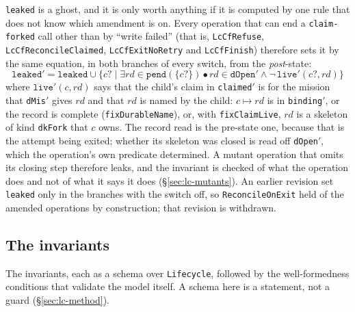 \documentclass[a4paper,10pt,fleqn]{article}
\newcommand{\field}[1]{\texttt{#1}}
\begin{document}
\field{leaked} is a ghost, and it is only worth anything if it is computed
by one rule that does not know which amendment is on. Every operation that
can end a \field{claim-forked} call other than by ``write failed'' (that
is, \field{LcCfRefuse}, \field{LcCfReconcileClaimed}, \field{LcCfExitNoRetry}
and \field{LcCfFinish}) therefore sets it by the same equation, in both
branches of every switch, from the \emph{post}-state:
\[
\field{leaked}' = \field{leaked} \cup \{ c? \mid \exists rd \in \field{pend}(\{c?\}) \bullet
  rd \in \field{dOpen}' \land \lnot\,\field{live}'(c?, rd) \}
\]
where $\field{live}'(c, rd)$ says that the child's claim in
\field{claimed}$'$ is for the mission that \field{dMis}$'$ gives $rd$ and
that $rd$ is named by the child: $c \mapsto rd$ is in \field{binding}$'$, or
the record is complete (\field{fixDurableName}), or, with
\field{fixClaimLive}, $rd$ is a skeleton of kind \field{dkFork} that $c$
owns. The record read is the pre-state one, because that is the
attempt being exited; whether its skeleton was closed is read off
\field{dOpen}$'$, which the operation's own predicate determined. A mutant
operation that omits its closing step therefore leaks, and the invariant is
checked of what the operation does and not of what it says it does
(\S\ref{sec:lc-mutants}). An earlier revision set \field{leaked} only in the
branches with the switch off, so \field{ReconcileOnExit} held of the
amended operations by construction; that revision is withdrawn.


\subsection{The invariants}
\label{sec:lc-invariants}

The invariants, each as a schema over \field{Lifecycle}, followed by
the well-formedness conditions that validate the model itself. A schema here is a statement, not a guard (\S\ref{sec:lc-method}).
\end{document}
